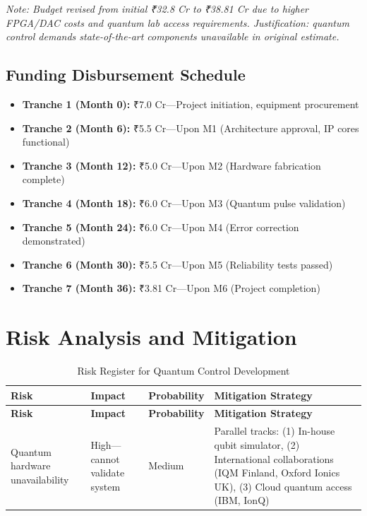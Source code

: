 \documentclass[12pt,a4paper]{article}
\begin{document}
\begin{enumerate}[leftmargin=*]
\textit{Note: Budget revised from initial ₹32.8 Cr to ₹38.81 Cr due to higher FPGA/DAC costs and quantum lab access requirements. Justification: quantum control demands state-of-the-art components unavailable in original estimate.}

\subsection{Funding Disbursement Schedule}

\begin{itemize}[leftmargin=*]
    \item \textbf{Tranche 1 (Month 0):} ₹7.0 Cr—Project initiation, equipment procurement
    \item \textbf{Tranche 2 (Month 6):} ₹5.5 Cr—Upon M1 (Architecture approval, IP cores functional)
    \item \textbf{Tranche 3 (Month 12):} ₹5.0 Cr—Upon M2 (Hardware fabrication complete)
    \item \textbf{Tranche 4 (Month 18):} ₹6.0 Cr—Upon M3 (Quantum pulse validation)
    \item \textbf{Tranche 5 (Month 24):} ₹6.0 Cr—Upon M4 (Error correction demonstrated)
    \item \textbf{Tranche 6 (Month 30):} ₹5.5 Cr—Upon M5 (Reliability tests passed)
    \item \textbf{Tranche 7 (Month 36):} ₹3.81 Cr—Upon M6 (Project completion)
\end{itemize}

\newpage

\section{Risk Analysis and Mitigation}

\begin{longtable}{@{}p{3.5cm}p{4cm}p{3cm}p{4cm}@{}}
\caption{Risk Register for Quantum Control Development} \\
\toprule
\textbf{Risk} & \textbf{Impact} & \textbf{Probability} & \textbf{Mitigation Strategy} \\
\midrule
\endfirsthead
\toprule
\textbf{Risk} & \textbf{Impact} & \textbf{Probability} & \textbf{Mitigation Strategy} \\
\midrule
\endhead
\bottomrule
\endfoot

Quantum hardware unavailability & High—cannot validate system & Medium & Parallel tracks: (1) In-house qubit simulator, (2) International collaborations (IQM Finland, Oxford Ionics UK), (3) Cloud quantum access (IBM, IonQ) \\
\midrule


\end{longtable}
\end{enumerate}
\end{document}
